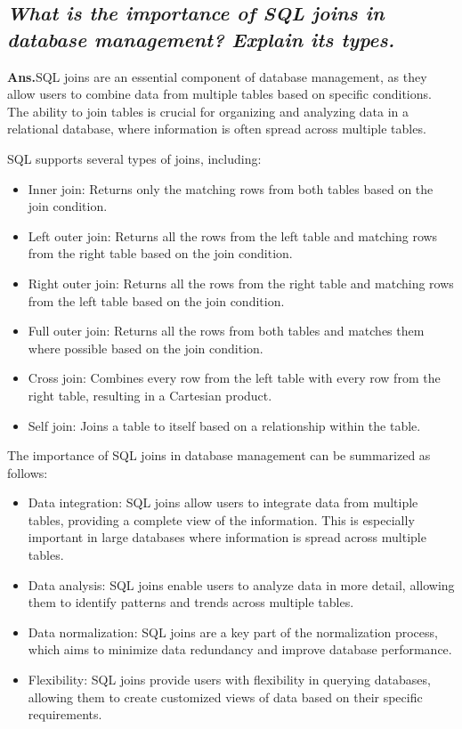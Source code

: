 \documentclass{article}
\begin{document}
\subsection{\textit{What is the importance of SQL joins in database management? Explain its
types.}}
\textbf{Ans.}SQL joins are an essential component of database management, as they allow users to combine data from multiple tables based on specific conditions. The ability to join tables is crucial for organizing and analyzing data in a relational database, where information is often spread across multiple tables.

SQL supports several types of joins, including:
\begin{itemize}
    \item Inner join: Returns only the matching rows from both tables based on the join condition.
    \item Left outer join: Returns all the rows from the left table and matching rows from the right table based on the join condition.
    \item Right outer join: Returns all the rows from the right table and matching rows from the left table based on the join condition.
    \item Full outer join: Returns all the rows from both tables and matches them where possible based on the join condition.
    \item Cross join: Combines every row from the left table with every row from the right table, resulting in a Cartesian product.
    \item Self join: Joins a table to itself based on a relationship within the table.
\end{itemize}
The importance of SQL joins in database management can be summarized as follows:
\begin{itemize}
    \item Data integration: SQL joins allow users to integrate data from multiple tables, providing a complete view of the information. This is especially important in large databases where information is spread across multiple tables.
    \item Data analysis: SQL joins enable users to analyze data in more detail, allowing them to identify patterns and trends across multiple tables.
    \item Data normalization: SQL joins are a key part of the normalization process, which aims to minimize data redundancy and improve database performance.
    \item Flexibility: SQL joins provide users with flexibility in querying databases, allowing them to create customized views of data based on their specific requirements.
\end{itemize}
\end{document}
